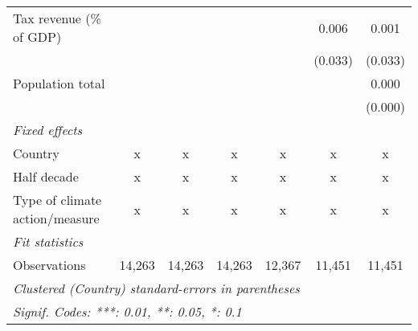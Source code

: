 \begin{tabular}{lcccccc}
   Tax revenue (\% of GDP)                                       &         &         &         &         & 0.006   & 0.001\\   
                                                                 &         &         &         &         & (0.033) & (0.033)\\   
   Population total                                              &         &         &         &         &         & 0.000\\   
                                                                 &         &         &         &         &         & (0.000)\\   
   \emph{Fixed effects}\\
   Country                                                       & x       & x       & x       & x       & x       & x\\  
   Half decade                                                   & x       & x       & x       & x       & x       & x\\  
   Type of climate action/measure                                & x       & x       & x       & x       & x       & x\\  
   \midrule \emph{Fit statistics}\\
   Observations                                                  & 14,263  & 14,263  & 14,263  & 12,367  & 11,451  & 11,451\\  
   \midrule
   \multicolumn{7}{l}{\emph{Clustered (Country) standard-errors in parentheses}}\\
   \multicolumn{7}{l}{\emph{Signif. Codes: ***: 0.01, **: 0.05, *: 0.1}}\\
\end{tabular}
\par\endgroup


